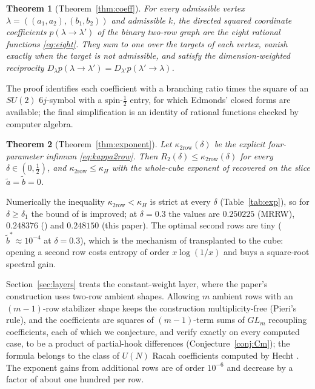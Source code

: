 \documentclass[11pt]{amsart}
\newtheorem{theorem}{Theorem}[section]
\theoremstyle{definition}
\begin{document}
\begin{theorem}[Theorem~\ref{thm:coeff}]\label{thm:main-coeff}
For every admissible vertex $\lambda=((a_1,a_2),(b_1,b_2))$ and admissible $k$, the directed squared coordinate coefficients $p(\lambda\to\lambda')$ of the binary two-row graph are the eight rational functions \eqref{eq:eight}. They sum to one over the targets of each vertex, vanish exactly when the target is not admissible, and satisfy the dimension-weighted reciprocity $D_\lambda p(\lambda\to\lambda')=D_{\lambda'}p(\lambda'\to\lambda)$.
\end{theorem}

The proof identifies each coefficient with a branching ratio times the square of an $SU(2)$ $6j$-symbol with a spin-$\tfrac12$ entry, for which Edmonds' closed forms are available; the final simplification is an identity of rational functions checked by computer algebra.

\begin{theorem}[Theorem~\ref{thm:exponent}]\label{thm:main-exp}
Let $\kappa_{2\mathrm{row}}(\delta)$ be the explicit four-parameter infimum \eqref{eq:kappa2row}. Then $R_2(\delta)\le\kappa_{2\mathrm{row}}(\delta)$ for every $\delta\in(0,\tfrac12)$, and $\kappa_{2\mathrm{row}}\le\kappa_H$ with the whole-cube exponent of \cite{OAI2026} recovered on the slice $\tilde a=\tilde b=0$.
\end{theorem}

Numerically the inequality $\kappa_{2\mathrm{row}}<\kappa_H$ is strict at every $\delta$ (Table~\ref{tab:exp}), so for $\delta\ge\delta_1$ the bound of \cite[Thm.~1.1]{OAI2026} is improved; at $\delta=0.3$ the values are $0.250225$ (MRRW), $0.248376$ (\cite{OAI2026}) and $0.248150$ (this paper). The optimal second rows are tiny ($\tilde b^*\approx10^{-4}$ at $\delta=0.3$), which is the mechanism of \cite[Prop.~7.3]{OAI2026} transplanted to the cube: opening a second row costs entropy of order $x\log(1/x)$ and buys a square-root spectral gain.

Section~\ref{sec:layers} treats the constant-weight layer, where the paper's construction uses two-row ambient shapes. Allowing $m$ ambient rows with an $(m-1)$-row stabilizer shape keeps the construction multiplicity-free (Pieri's rule), and the coefficients are squares of $(m-1)$-term sums of $GL_m$ recoupling coefficients, each of which we conjecture, and verify exactly on every computed case, to be a product of partial-hook differences (Conjecture~\ref{conj:Cm}); the formula belongs to the class of $U(N)$ Racah coefficients computed by Hecht \cite{Hecht}. The exponent gains from additional rows are of order $10^{-6}$ and decrease by a factor of about one hundred per row.
\end{document}
